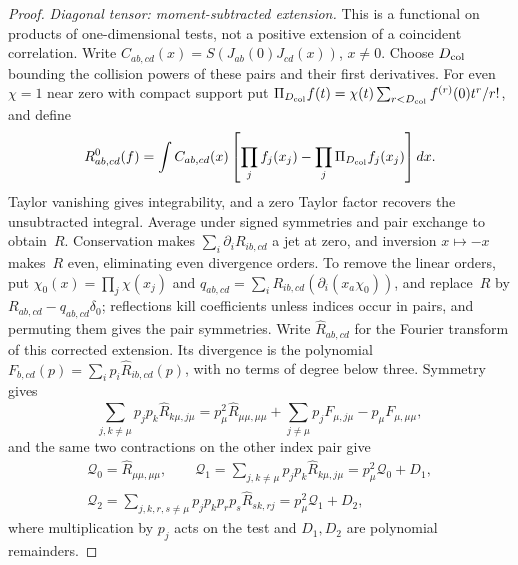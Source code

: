 \begin{proof}
\emph{Diagonal tensor: moment-subtracted extension.} This is a functional on products of one-dimensional tests, not a positive extension of a coincident correlation. Write $C_{ab,cd}(x)=S(J_{ab}(0)J_{cd}(x))$, $x\ne0$. Choose $D_{\rm col}$ bounding the collision powers of these pairs and their first derivatives. For even $\chi=1$ near zero with compact support put $\Pi_{D_{\rm col}}f(t)=\chi(t)\sum_{r<D_{\rm col}}f^{(r)}(0)t^r/r!$, and define
\begin{equation*}
R^0_{ab,cd}(f)=\int C_{ab,cd}(x)\left[\prod_jf_j(x_j)-\prod_j\Pi_{D_{\rm col}}f_j(x_j)\right]dx.
\end{equation*}
Taylor vanishing gives integrability, and a zero Taylor factor recovers the unsubtracted integral. Average under signed symmetries and pair exchange to obtain~$R$. Conservation makes $\sum_i\partial_iR_{ib,cd}$ a jet at zero, and inversion $x\mapsto-x$ makes~$R$ even, eliminating even divergence orders. To remove the linear orders, put $\chi_0(x)=\prod_j\chi(x_j)$ and $q_{ab,cd}=\sum_i R_{ib,cd}(\partial_i(x_a\chi_0))$, and replace~$R$ by $R_{ab,cd}-q_{ab,cd}\delta_0$; reflections kill coefficients unless indices occur in pairs, and permuting them gives the pair symmetries. Write $\widehat R_{ab,cd}$ for the Fourier transform of this corrected extension. Its divergence is the polynomial $F_{b,cd}(p)=\sum_ip_i\widehat R_{ib,cd}(p)$, with no terms of degree below three. Symmetry gives
\begin{equation*}
\sum_{j,k\ne \mu}p_jp_k\widehat R_{k\mu,j\mu}
=p_\mu^2\widehat R_{\mu\mu,\mu\mu}+\sum_{j\ne \mu}p_jF_{\mu,j\mu}-p_\mu F_{\mu,\mu\mu},
\end{equation*}
and the same two contractions on the other index pair give
\begin{equation}\label{eq:H-tensor-responses}
\begin{gathered}
\mathcal Q_0=\widehat R_{\mu\mu,\mu\mu},\qquad
\mathcal Q_1=\sum_{j,k\ne \mu}p_jp_k\widehat R_{k\mu,j\mu}=p_\mu^2\mathcal Q_0+D_1,\\
\mathcal Q_2=\sum_{j,k,r,s\ne \mu}p_jp_kp_rp_s\widehat R_{sk,rj}=p_\mu^2\mathcal Q_1+D_2,
\end{gathered}
\end{equation}
where multiplication by $p_j$ acts on the test and $D_1,D_2$ are polynomial remainders.


\end{proof}
